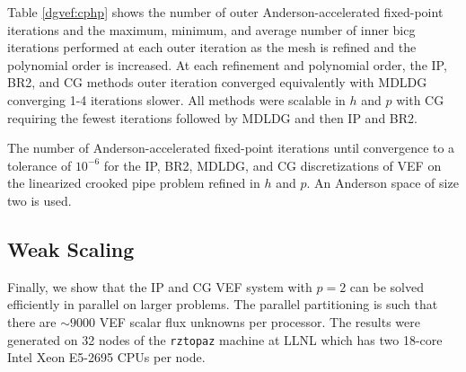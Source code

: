 \documentclass[../doc.tex]{subfiles}
\begin{document}
Table \ref{dgvef:cphp} shows the number of outer Anderson-accelerated fixed-point iterations and the maximum, minimum, and average number of inner \gls{bicg} iterations performed at each outer iteration as the mesh is refined and the polynomial order is increased. At each refinement and polynomial order, the IP, BR2, and CG methods outer iteration converged equivalently with MDLDG converging 1-4 iterations slower. All methods were scalable in $h$ and $p$ with CG requiring the fewest iterations followed by MDLDG and then IP and BR2. 
\begin{table}
\centering
\caption{The number of Anderson-accelerated fixed-point iterations until convergence to a tolerance of $10^{-6}$ for the IP, BR2, MDLDG, and CG discretizations of VEF on the linearized crooked pipe problem refined in $h$ and $p$. An Anderson space of size two is used.}
\label{dgvef:cphp}
\begin{adjustbox}{max width = \textwidth}

\end{adjustbox}
\end{table}

\subsection{Weak Scaling} \label{dgvef_sec:weak}
Finally, we show that the IP and CG VEF system with $p=2$ can be solved efficiently in parallel on larger problems. The parallel partitioning is such that there are $\sim\!9000$ VEF scalar flux unknowns per processor. The results were generated on 32 nodes of the \texttt{rztopaz} machine at LLNL which has two 18-core Intel Xeon E5-2695 CPUs per node. 
\end{document}
